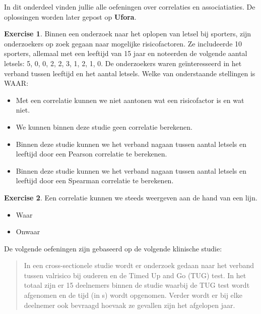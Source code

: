\documentclass[
]{book}
\providecommand{\tightlist}{%
  \setlength{\itemsep}{0pt}\setlength{\parskip}{0pt}}
\theoremstyle{definition}
\theoremstyle{definition}
\theoremstyle{definition}
\newtheorem{exercise}{Exercise}[chapter]
\theoremstyle{definition}
\theoremstyle{remark}
\begin{document}
In dit onderdeel vinden jullie alle oefeningen over correlaties en associatiaties. De oplossingen worden later gepost op \textbf{Ufora}.

\begin{exercise}

Binnen een onderzoek naar het oplopen van letsel bij sporters, zijn onderzoekers op zoek gegaan naar mogelijke risicofactoren. Ze includeerde 10 sporters, allemaal met een leeftijd van 15 jaar en noteerden de volgende aantal letsels: 5, 0, 0, 2, 2, 3, 1, 2, 1, 0. De onderzoekers waren geïnteresseerd in het verband tussen leeftijd en het aantal letsels. Welke van onderstaande stellingen is WAAR:

\begin{itemize}
\tightlist
\item
  Met een correlatie kunnen we niet aantonen wat een risicofactor is en wat niet.
\item
  We kunnen binnen deze studie geen correlatie berekenen.
\item
  Binnen deze studie kunnen we het verband nagaan tussen aantal letsels en leeftijd door een Pearson correlatie te berekenen.
\item
  Binnen deze studie kunnen we het verband nagaan tussen aantal letsels en leeftijd door een Spearman correlatie te berekenen.
\end{itemize}

\end{exercise}

\begin{exercise}

Een correlatie kunnen we steeds weergeven aan de hand van een lijn.

\begin{itemize}
\tightlist
\item
  Waar
\item
  Onwaar
\end{itemize}

\end{exercise}

De volgende oefeningen zijn gebaseerd op de volgende klinische studie:

\begin{quote}
In een cross-sectionele studie wordt er onderzoek gedaan naar het verband tussen valrisico bij ouderen en de Timed Up and Go (TUG) test. In het totaal zijn er 15 deelnemers binnen de studie waarbij de TUG test wordt afgenomen en de tijd (in s) wordt opgenomen. Verder wordt er bij elke deelnemer ook bevraagd hoevaak ze gevallen zijn het afgelopen jaar.
\end{quote}
\end{document}
